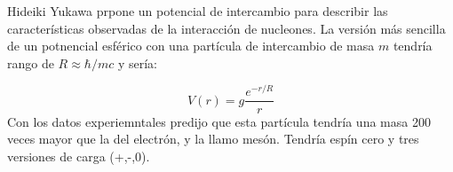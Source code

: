 Hideiki Yukawa prpone un potencial de intercambio para describir las características observadas de la interacción de nucleones. La versión más sencilla de un potnencial esférico con una partícula de intercambio de masa $m$ tendría rango de $R \approx \hbar /mc$ y sería:

\begin{equation}
    V(r) = g \frac{e^{-r/R}}{r}
\end{equation}
Con los datos experiemntales predijo que esta partícula tendría una masa 200 veces mayor que la del electrón, y la llamo mesón. Tendría espín cero y tres versiones de carga (+,-,0). 


